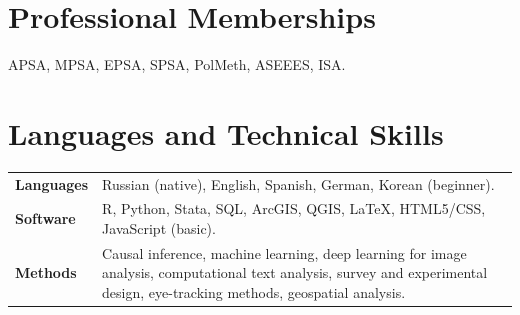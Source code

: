 \documentclass[10pt]{article}
\begin{document}
\section{Professional Memberships}
APSA, MPSA, EPSA, SPSA, PolMeth, ASEEES, ISA.

\section{Languages and Technical Skills}
\begin{tabularx}{\textwidth}{@{}>{\bfseries}l X@{}}
Languages & Russian (native), English, Spanish, German, Korean (beginner).\\
Software & R, Python, Stata, SQL, ArcGIS, QGIS, \LaTeX, HTML5/CSS, JavaScript (basic).\\
Methods & Causal inference,  machine learning, deep learning for image analysis, computational text analysis, survey and experimental design,  eye-tracking methods, geospatial analysis.\\
\end{tabularx}
\end{document}
